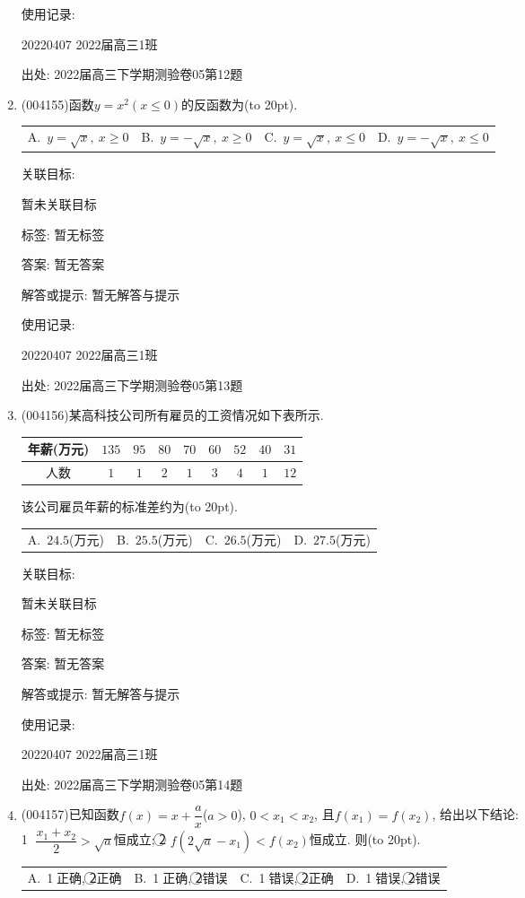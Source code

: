 \documentclass[10pt,a4paper]{article}
\newcommand{\bracket}[1]{(\hbox to #1pt{})}
\newcommand{\fourch}[4]{\par\begin{tabular}{p{.23\textwidth}p{.23\textwidth}p{.23\textwidth}p{.23\textwidth}}
A.~#1 &B.~#2& C.~#3& D.~#4
\end{tabular}}
\begin{document}
\begin{enumerate}[1.]
使用记录:

20220407	2022届高三1班	


出处: 2022届高三下学期测验卷05第12题
\item { (004155)}函数$y=x^2(x\le 0)$的反函数为\bracket{20}.
\fourch{$y=\sqrt{x}, \ x\ge 0$}{$y=-\sqrt{x}, \ x\ge 0$}{$y=\sqrt{x}, \ x\le 0$}{$y=-\sqrt{x}, \ x\le 0$}


关联目标:

暂未关联目标



标签: 暂无标签

答案: 暂无答案

解答或提示: 暂无解答与提示

使用记录:

20220407	2022届高三1班	


出处: 2022届高三下学期测验卷05第13题
\item { (004156)}某高科技公司所有雇员的工资情况如下表所示.
\begin{center}
    \begin{tabular}{|c|c|c|c|c|c|c|c|c|}
        \hline
        年薪(万元) & $135$&$95$&$80$&$70$&$60$&$52$&$40$&$31$\\ \hline
        人数& $1$&$1$&$2$&$1$&$3$&$4$&$1$&$12$\\ \hline
    \end{tabular}
\end{center}
该公司雇员年薪的标准差约为\bracket{20}.
\fourch{$24.5$(万元)}{$25.5$(万元)}{$26.5$(万元)}{$27.5$(万元)}


关联目标:

暂未关联目标



标签: 暂无标签

答案: 暂无答案

解答或提示: 暂无解答与提示

使用记录:

20220407	2022届高三1班	


出处: 2022届高三下学期测验卷05第14题
\item { (004157)}已知函数$f(x)=x+\dfrac ax$($a>0$), $0<x_1<x_2$, 且$f(x_1)=f(x_2)$, 给出以下结论:\\
\textcircled{1} $\dfrac{x_1+x_2}2>\sqrt a$恒成立; \textcircled{2} $f(2\sqrt a-x_1)<f(x_2)$恒成立. 则\bracket{20}.
\fourch{\textcircled{1}正确, \textcircled{2}正确}{\textcircled{1}正确, \textcircled{2}错误}{\textcircled{1}错误, \textcircled{2}正确}{\textcircled{1}错误, \textcircled{2}错误}



\end{enumerate}
\end{document}
